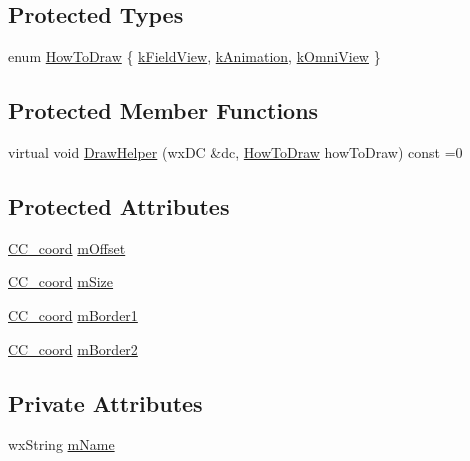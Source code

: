 \subsection*{Protected Types}
\begin{DoxyCompactItemize}
\item 
enum \hyperlink{a00140_ad4ba026a6f87cccc7b00eae19c55bd87}{How\-To\-Draw} \{ \hyperlink{a00140_ad4ba026a6f87cccc7b00eae19c55bd87a7b9dd27eb28304baf316bdb497923dc7}{k\-Field\-View}, 
\hyperlink{a00140_ad4ba026a6f87cccc7b00eae19c55bd87afa59147ad84e22f0f796c587f08f4f45}{k\-Animation}, 
\hyperlink{a00140_ad4ba026a6f87cccc7b00eae19c55bd87a38130d7cb8673b6230da192be8012cb5}{k\-Omni\-View}
 \}
\end{DoxyCompactItemize}
\subsection*{Protected Member Functions}
\begin{DoxyCompactItemize}
\item 
virtual void \hyperlink{a00140_a89408a60469c948186c1bd65164df4e9}{Draw\-Helper} (wx\-D\-C \&dc, \hyperlink{a00140_ad4ba026a6f87cccc7b00eae19c55bd87}{How\-To\-Draw} how\-To\-Draw) const =0
\end{DoxyCompactItemize}
\subsection*{Protected Attributes}
\begin{DoxyCompactItemize}
\item 
\hyperlink{a00029}{C\-C\-\_\-coord} \hyperlink{a00140_a604232d52fdedc70d6de9aea88ef47b2}{m\-Offset}
\item 
\hyperlink{a00029}{C\-C\-\_\-coord} \hyperlink{a00140_a6382d3ac8f5c3ba0c451f60e1cb5d044}{m\-Size}
\item 
\hyperlink{a00029}{C\-C\-\_\-coord} \hyperlink{a00140_aa176835c9d17912af7f8bf93996641c4}{m\-Border1}
\item 
\hyperlink{a00029}{C\-C\-\_\-coord} \hyperlink{a00140_a85badafc6653affd2cae0cdf3065da18}{m\-Border2}
\end{DoxyCompactItemize}
\subsection*{Private Attributes}
\begin{DoxyCompactItemize}
\item 
wx\-String \hyperlink{a00140_a5cc015d76e3c8b2eb1d8506946484f1c}{m\-Name}
\end{DoxyCompactItemize}


